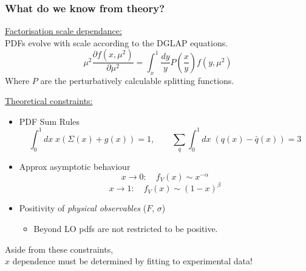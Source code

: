 \documentclass[10pt]{beamer}
\newcommand{\be}{\begin{equation*}}
\newcommand{\ee}{\end{equation*}}
\begin{document}
\begin{frame}
\begin{columns}
\begin{column}{0.3\textwidth}
{%
      }
      
      \end{column}
      
      
 \end{columns}
      \vskip10pt



\end{frame}

\begin{frame}
\frametitle{What do we know from theory?}
\small \underline{Factorisation scale dependance:} \\
PDFs evolve with scale according to the DGLAP equations.
\be \mu^2 \frac{\partial f(x,\mu^2)}{\partial \mu^2} = \int_x^1 \frac{dy}{y} P\left( \frac{x}{y} \right) f (y,\mu^2)  \ee
Where $P$ are the perturbatively calculable splitting functions.

\small \underline{Theoretical constraints:} \\
\begin{itemize}
\item PDF Sum Rules
\be \int_0^1 dx\; x(\Sigma(x) + g(x)) = 1,\quad\quad   \sum_{q} \int_0^1 dx\; (q(x)-\bar{q}(x)) = 3 \ee
\end{itemize}

\begin{itemize}
\item Approx asymptotic behaviour
\be x \to 0: \quad f_V(x) \sim x^{-\alpha}\ee
\be x \to 1: \quad f_V(x) \sim (1-x)^{\beta}\ee
\end{itemize}

\begin{itemize}
\item Positivity of \emph{physical observables} ($F$, $\sigma$)
\begin{itemize}
\item Beyond LO pdfs are not restricted to be positive.
\end{itemize}
\end{itemize}

\begin{center}
Aside from these constraints,\\ $x$ dependence must be determined by fitting to experimental data!
\end{center}


\end{frame}
\end{document}
